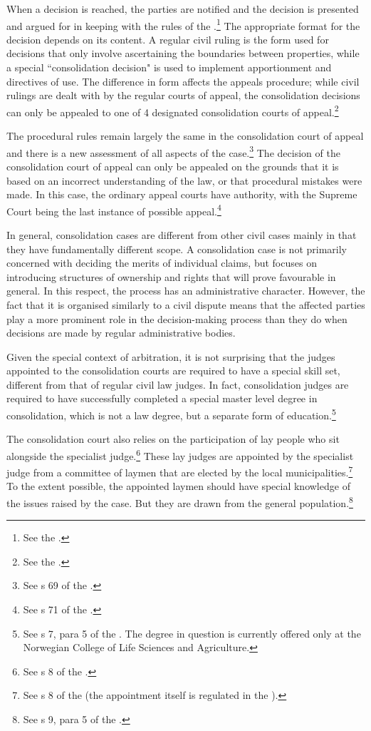 When a decision is reached, the parties are notified and the decision is presented and argued for in keeping with the rules of the \cite{cda05}.\footnote{See the 
\cite[7|22]{lca79}.} The appropriate format for the decision depends on its content. A regular civil ruling is the form used for decisions that only involve ascertaining the boundaries between properties, while a special ``consolidation decision" is used to implement apportionment and directives of use. The difference in form affects the appeals procedure; while civil rulings are dealt with by the regular courts of appeal, the consolidation decisions can only be appealed to one of 4 designated consolidation courts of appeal.\footnote{See  the \cite[61]{lca79}.}

The procedural rules remain largely the same in the consolidation court of appeal and there is a new assessment of all aspects of the case.\footnote{See s 69 of the \cite{lca79}.} The decision of the consolidation court of appeal can only be appealed on the grounds that it is based on an incorrect understanding of the law, or that procedural mistakes were made. In this case, the ordinary appeal courts have authority, with the Supreme Court being the last instance of possible appeal.\footnote{See s 71 of the \cite{lca79}.}

In general, consolidation cases are different from other civil cases mainly in that they have fundamentally different scope. A consolidation case is not primarily concerned with deciding the merits of individual claims, but focuses on introducing structures of ownership and rights that will prove favourable in general. In this respect, the process has an administrative character. However, the fact that it is organised similarly to a civil dispute means that the affected parties play a more prominent role in the decision-making process than they do when decisions are made by regular administrative bodies.

Given the special context of arbitration, it is not surprising that the judges appointed to the consolidation courts are required to have a special skill set, different from that of regular civil law judges. In fact, consolidation judges are required to have successfully completed a special master level degree in consolidation, which is not a law degree, but a separate form of education.\footnote{See s 7, para 5 of the \cite{lca79}. The degree in question is currently offered only at the Norwegian College of Life Sciences and Agriculture.} 

The consolidation court also relies on the participation of lay people who sit alongside the specialist judge.\footnote{See s 8 of the \cite{lca79}.} These lay judges are appointed by the specialist judge from a committee of laymen that are elected by the local municipalities.\footnote{See s 8 of the \cite{lca79} (the appointment itself is regulated in the \cite[64]{ca15}).} To the extent possible, the appointed laymen should have special knowledge of the issues raised by the case. But they are drawn from the general population.\footnote{See s 9, para 5 of the \cite{lca79}.}


